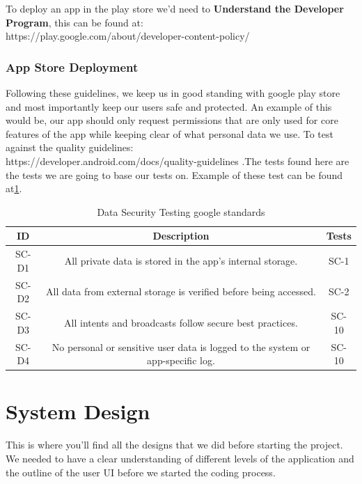 \documentclass[a4paper,12pt]{report}
\begin{document}
To deploy an app in the play store we'd need to
\textbf{Understand the Developer Program}, this can be found at:\\ https://play.google.com/about/developer-content-policy/
\subsection{App Store Deployment}
Following these guidelines, we keep us in good standing with google play store and most importantly keep our users safe and protected. An example of this would be, our app should only request permissions that are only used for core features of the app while keeping clear of what personal data we use. To test against the quality guidelines:\\ https://developer.android.com/docs/quality-guidelines .The tests found here are the tests we are going to base our tests on. Example of these test can be found at\ref{tab:SecurityTest}.


\begin{table}[h]
\begin{tabular}{||c c c||} 
 \hline
 \textbf{ID} & \textbf{Description} & \textbf{Tests} \\ [0.5ex] 
 \hline\hline
 SC-D1 & All private data is stored in the app's internal storage. & SC-1 \\ 
 \hline
 SC-D2 & All data from external storage is verified before being accessed. & SC-2 \\  
 \hline
 SC-D3 & All intents and broadcasts follow secure best practices. & SC-10 \\
 \hline
 SC-D4 & No personal or sensitive user data is logged to the system or app-specific log. & SC-10 \\
 \hline
\end{tabular}
\caption{Data Security Testing google standards}
\label{tab:SecurityTest}
\end{table}


\chapter{System Design}
This is where you’ll find all the designs that we did before starting the project. We needed to have a clear understanding of different levels of the application and the outline of the user UI before we started the coding process.
\end{document}
